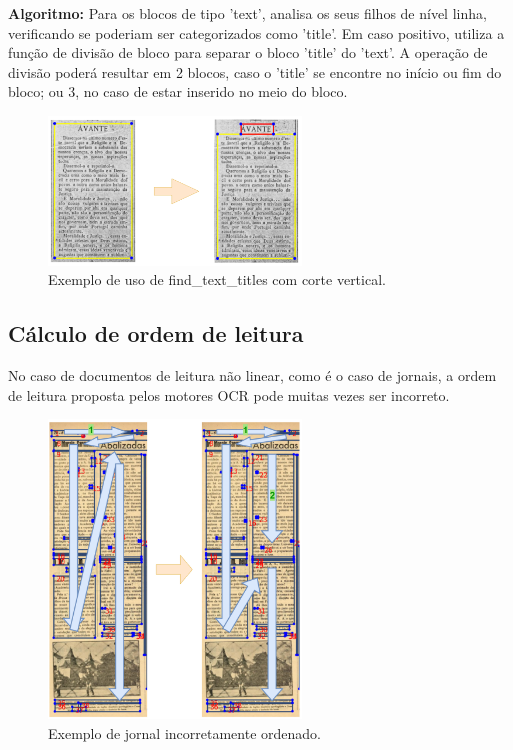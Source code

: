 \textbf{Algoritmo:} Para os blocos de tipo 'text', analisa os seus filhos de nível linha, verificando se poderiam ser categorizados como 'title'. Em caso positivo, utiliza a função de divisão de bloco para separar o bloco 'title' do 'text'. A operação de divisão poderá resultar em 2 blocos, caso o 'title' se encontre no início ou fim do bloco; ou 3, no caso de estar inserido no meio do bloco.


\begin{figure}[H]
	\centering
	\includegraphics[width=0.6\textwidth]{images/ilustracoes/find_titles_blocks.png}
	\caption{Exemplo de uso de find\_text\_titles com corte vertical.}
	\label{fig:find_titles_blocks}
\end{figure}



\subsection{Cálculo de ordem de leitura}
\label{contribution_reading_order}

No caso de documentos de leitura não linear, como é o caso de jornais, a ordem de leitura proposta pelos motores OCR pode muitas vezes ser incorreto.

\begin{figure}[H]
	\centering
	\includegraphics[width=0.6\textwidth]{images/ilustracoes/journal_wrong_order_example.png}
	\caption{Exemplo de jornal incorretamente ordenado.}
	\label{fig:journal_wrong_order_example}
\end{figure}


